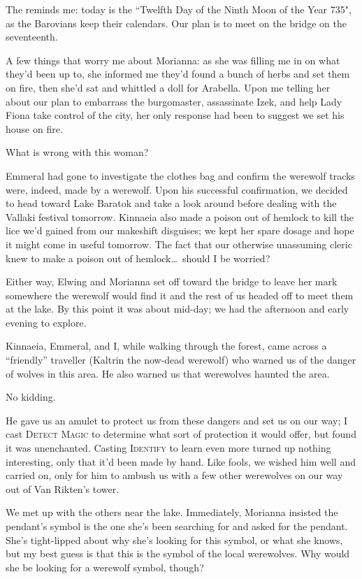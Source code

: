 The reminds me: today is the ``Twelfth Day of the Ninth Moon of the Year 735", as the Barovians keep their calendars. Our plan is to meet on the bridge on the seventeenth.

A few things that worry me about Morianna: as she was filling me in on what they'd been up to, she informed me they'd found a bunch of herbs and set them on fire, then she'd sat and whittled a doll for Arabella. Upon me telling her about our plan to embarrass the burgomaster, assassinate Izek, and help Lady Fiona take control of the city, her only response had been to suggest we set his house on fire.

What is wrong with this woman?

Emmeral had gone to investigate the clothes bag and confirm the werewolf tracks were, indeed, made by a werewolf. Upon his successful confirmation, we decided to head toward Lake Baratok and take a look around before dealing with the Vallaki festival tomorrow. Kinnaeia also made a poison out of hemlock to kill the lice we'd gained from our makeshift disguises; we kept her spare dosage and hope it might come in useful tomorrow. The fact that our otherwise unassuming cleric knew to make a poison out of hemlock\dots\ should I be worried?

Either way, Elwing and Morianna set off toward the bridge to leave her mark somewhere the werewolf would find it and the rest of us headed off to meet them at the lake. By this point it was about mid-day; we had the afternoon and early evening to explore.

Kinnaeia, Emmeral, and I, while walking through the forest, came across a ``friendly'' traveller (Kaltrin the now-dead werewolf) who warned us of the danger of wolves in this area. He also warned us that werewolves haunted the area.

No kidding.

He gave us an amulet to protect us from these dangers and set us on our way; I cast \textsc{Detect Magic} to determine what sort of protection it would offer, but found it was unenchanted. Casting \textsc{Identify} to learn even more turned up nothing interesting, only that it'd been made by hand. Like fools, we wished him well and carried on, only for him to ambush us with a few other werewolves on our way out of Van Rikten's tower.

We met up with the others near the lake. Immediately, Morianna insisted the pendant's symbol is the one she's been searching for and asked for the pendant. She's tight-lipped about why she's looking for this symbol, or what she knows, but my best guess is that this is the symbol of the local werewolves. Why would she be looking for a werewolf symbol, though?

